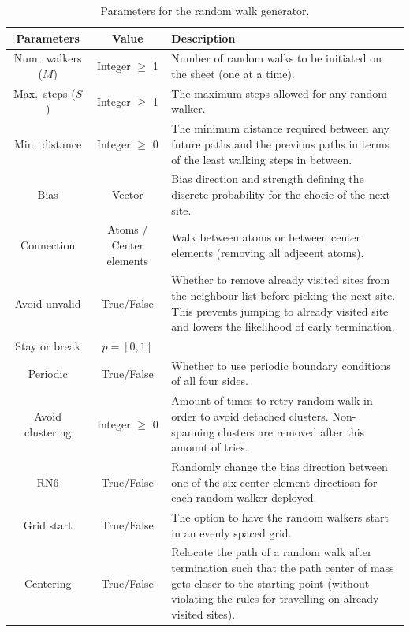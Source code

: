 \begin{table}[H]
  \begin{center}
  \caption{Parameters for the random walk generator.}
  \label{tab:RW_params}
  \begin{tabular}{ | c | c | m{8cm} |} \hline
  \textbf{Parameters} & \textbf{Value} & \textbf{Description}  \\ \hline
  Num.\ walkers ($M$) & Integer $\ge$ 1 & Number of random walks to be initiated on the sheet (one at a time). \\ \hline
  Max.\ steps ($S$)  & Integer $\ge$ 1 &The maximum steps allowed for any random walker. \\ \hline
  Min.\ distance  & Integer $\ge$ 0 &The minimum distance required between any future paths and the previous paths in terms of the least walking steps in between. \\ \hline
  Bias  & Vector & Bias direction and strength defining the discrete probability for the chocie of the next site. \\ \hline
  Connection  & Atoms / Center elements & Walk between atoms or between center elements (removing all adjecent atoms). \\ \hline
  Avoid unvalid  & True/False & Whether to remove already visited sites from the neighbour list before picking the next site. This prevents jumping to already visited site and lowers the likelihood of early termination.  \\ \hline
  Stay or break  & $p = [0,1]$ & \\ \hline
  Periodic  & True/False & Whether to use periodic boundary conditions of all four sides. \\ \hline
  Avoid clustering  & Integer $\ge$ 0 & Amount of times to retry random walk in order to avoid detached clusters. Non-spanning clusters are removed after this amount of tries.\\ \hline
  RN6  & True/False & Randomly change the bias direction between one of the six center element directiosn for each random walker deployed. \\ \hline
  Grid start  & True/False & The option to have the random walkers start in an evenly spaced grid. \\ \hline
  Centering  & True/False & Relocate the path of a random walk after termination such that the path center of mass gets closer to the starting point (without violating the rules for travelling on already visited sites).\\ \hline
  \end{tabular}
  \end{center}
\end{table}

